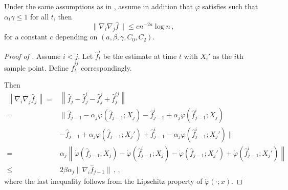 \documentclass[10pt,a4paper]{amsart}
\begin{document}
\begin{theorem}\label{thm:6.2-second-order-stab-sgd}
    Under the same assumptions as in , assume in addition that $\varphi$ satisfies  such that $\alpha_t\gamma\le 1$ for all $t$, then
    $$\|\nabla_i\nabla_j\hat f\|\le cn^{-2a}\log n\,,$$
    for a constant $c$ depending on $(a,\beta,\gamma,C_0,C_2)$.
\end{theorem}

\begin{proof}[Proof of ]
     Assume $i<j$. Let $\hat f_t^{i}$ be the estimate at time $t$ with $X_i'$ as the $i$th sample point. Define $\hat f_t^{ij}$ correspondingly.

     Then
\begin{align}
\left\|\nabla_i\nabla_j\hat f_{j}\right\|= & \left\|\hat f_{j} - \hat f^i_{j} - \hat f^j_{j}+\hat f^{ij}_{j}\right\|\nonumber\\
=&\big\|\hat f_{j-1}-\alpha_{j}\dot\varphi(\hat f_{j-1};X_j) -
\hat f^i_{j-1}+\alpha_{j}\dot\varphi(\hat f^i_{j-1};X_j) \nonumber\\
&-\hat f_{j-1}+\alpha_{j}\dot\varphi(\hat f_{j-1};X_j') +
\hat f^i_{j-1}-\alpha_{j}\dot\varphi(\hat f^i_{j-1};X_j')\big\| \nonumber\\
=&\alpha_{j}\left\|\dot\varphi(\hat f_{j-1};X_j)-\dot\varphi(\hat f^i_{j-1};X_j)-\dot\varphi(\hat f_{j-1};X_j')+\dot\varphi(\hat f^i_{j-1};X_j')\right\|\nonumber\\
\le & 2\beta\alpha_{j}  \|\nabla_i\hat f_{j-1}\|\,,\label{eq:6.2-eta_j}\,,
\end{align}
where the last inequality follows from the Lipschitz property of $\dot\varphi(\cdot;x)$.


\end{proof}
\end{document}
